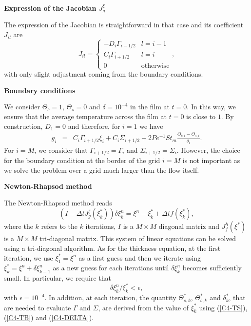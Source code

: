 \vspace{.5cm}  \textbf{Expression   of  the   Jacobian  $J_{g}^{\xi}$}
\vspace{.5cm}

The expression of the Jacobian is straightforward in that case and its
coefficient $J_{il}$ are
\begin{equation}
  J_{il}=
  \begin{cases}
    -D_i\Gamma_{i-1/2}&
    l = i-1\\
    C_i\Gamma_{i+1/2} & l = i \\
    0 & \text{otherwise}
  \end{cases},
  \label{C4-C2-eq1233}
\end{equation}
with only slight adjustment coming from the boundary conditions.

\vspace{.5cm} \textbf{Boundary conditions} \vspace{.5cm}

We consider $\Theta_b =1$, $\Theta_s=0$  and $\delta = 10^{-4}$ in the
film at  $t=0$. In this  way, we  ensure that the  average temperature
across the film at $t=0$ is close to $1$. By construction, $D_1=0$ and
therefore, for $i=1$ we have
\begin{eqnarray}
  g_i &=& C_i\Gamma_{i+1/2}\xi_{i}+ C_i\Sigma_{i+1/2} +2Pe^{-1}St_m\frac{\Theta_{b,i}-\Theta_{s,i}}{\delta_i}.
\end{eqnarray}
For   $i=M$,   we    consider   that   $\Gamma_{i+1/2}=\Gamma_i$   and
$\Sigma_{i+1/2}=\Sigma_i$.   However,  the  choice  for  the  boundary
condition at the border of the grid $i=M$ is not important as we solve
the problem over a grid much larger than the flow itself.

\vspace{.5cm} \textbf{Newton-Rhapsod method} \vspace{.5cm}

The Newton-Rhapsod method reads
\begin{equation}
  (I-\Delta tJ^{\xi}_{g}(\xi_k^*))\delta \xi_k^n=\xi^n-\xi_k^*+\Delta t f(\xi_k^*),
\end{equation}
where the  $k$ refers  to the $k$  iterations, $I$ is  a $M  \times M$
diagonal  matrix and  $J_f^h(\xi^*)$ is  a $M  \times M$  tri-diagonal
matrix.   This  system of  linear  equations  can  be solved  using  a
tri-diagonal algorithm.  As  for the thickness equation,  at the first
iteration,  we use  $\xi^*_1 =  \xi^n$ as  a first  guess and  then we
iterate using $\xi^*_k = \xi^n+\delta  \xi_{k-1}^n$ as a new guess for
each iterations  until $\delta \xi^n_{k}$ becomes  sufficiently small.
In particular, we require that
\begin{equation}
  \delta \xi^n_k/\xi^*_{k}<\epsilon,
\end{equation}
with  $\epsilon  = 10^{-4}$.   In  addition,  at each  iteration,  the
quantity $\Theta^*_{s,k}$, $\Theta^*_{b,k}$ and $\delta^*_k$, that are
needed to evaluate  $\Gamma$ and $\Sigma$, are derived  from the value
of $\xi^*_{k}$ using (\ref{C4-TS}), (\ref{C4-TB}) and (\ref{C4-DELTA}).

